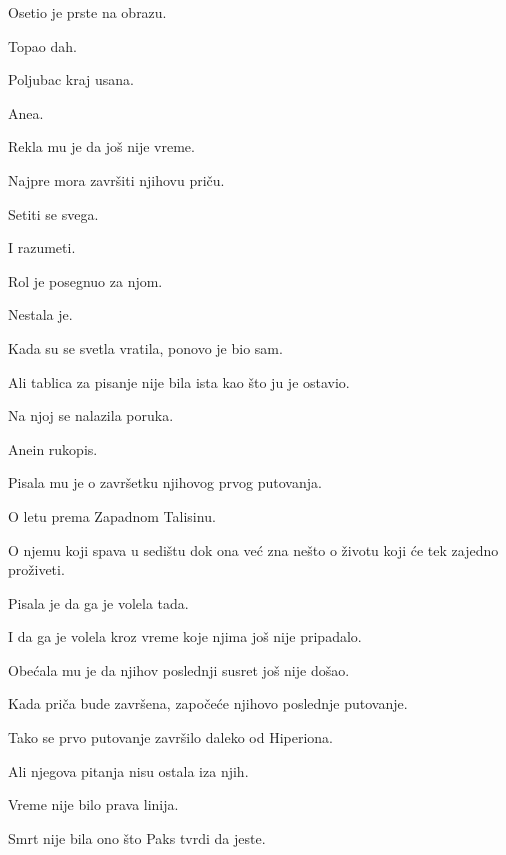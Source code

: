 Osetio je prste na obrazu.

Topao dah.

Poljubac kraj usana.

\bigskip

Anea.

\bigskip

Rekla mu je da još nije vreme.

\bigskip

Najpre mora završiti njihovu priču.

Setiti se svega.

I razumeti.

\bigskip

Rol je posegnuo za njom.

\bigskip

Nestala je.

\bigskip

Kada su se svetla vratila, ponovo je bio sam.

\bigskip

Ali tablica za pisanje nije bila ista kao što ju je ostavio.

\bigskip

Na njoj se nalazila poruka.

\bigskip

Anein rukopis.

\bigskip

Pisala mu je o završetku njihovog prvog putovanja.

O letu prema Zapadnom Talisinu.

O njemu koji spava u sedištu dok ona već zna nešto o životu koji će tek zajedno proživeti.

\bigskip

Pisala je da ga je volela tada.

I da ga je volela kroz vreme koje njima još nije pripadalo.

\bigskip

Obećala mu je da njihov poslednji susret još nije došao.

\bigskip

Kada priča bude završena, započeće njihovo poslednje putovanje.

\bigskip

Tako se prvo putovanje završilo daleko od Hiperiona.

Ali njegova pitanja nisu ostala iza njih.

\bigskip

Vreme nije bilo prava linija.

Smrt nije bila ono što Paks tvrdi da jeste.

